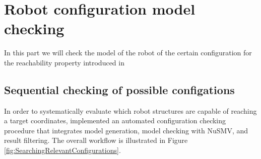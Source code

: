 %
%
%
%
%

\newpage
\section{Robot configuration model checking}
\label{ch:configurationChecking}

In this part we will check the model of the robot of the certain configuration 
for the reachability property introduced in 



\subsection{Sequential checking of possible configations}
In order to systematically evaluate which robot structures are capable 
of reaching a target coordinates, implemented an automated configuration checking 
procedure that integrates model generation, model checking with NuSMV, and 
result filtering. The overall workflow is illustrated in Figure 
\ref{fig:SearchingRelevantConfigurations}.

